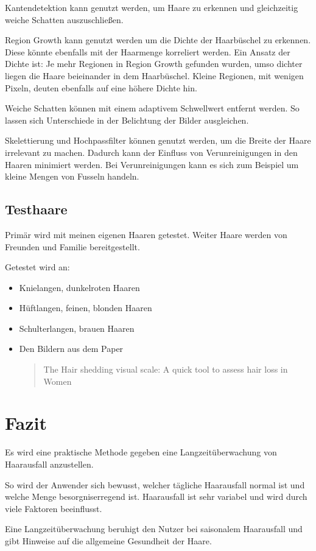 \documentclass[german,a4paper,12pt]{llncs}
\begin{document}
Kantendetektion kann genutzt werden, um Haare zu erkennen und gleichzeitig weiche Schatten auszuschließen.  

Region Growth kann genutzt werden um die Dichte der Haarbüschel zu erkennen. Diese könnte ebenfalls mit der Haarmenge korreliert werden. Ein Ansatz der Dichte ist: Je mehr Regionen in Region Growth gefunden wurden, umso dichter liegen die Haare beieinander in dem Haarbüschel. Kleine Regionen, mit wenigen Pixeln, deuten ebenfalls auf eine höhere Dichte hin. 

Weiche Schatten können mit einem adaptivem Schwellwert entfernt werden. So lassen sich Unterschiede in der Belichtung der Bilder ausgleichen. 

Skelettierung und Hochpassfilter können genutzt werden, um die Breite der Haare irrelevant zu machen. Dadurch kann der Einfluss von Verunreinigungen in den Haaren minimiert werden. Bei Verunreinigungen kann es sich zum Beispiel um kleine Mengen von Fusseln handeln.

\subsection{Testhaare}

Primär wird mit meinen eigenen Haaren getestet. Weiter Haare werden von Freunden und Familie bereitgestellt.

Getestet wird an:
\begin{itemize}
	\item Knielangen, dunkelroten Haaren
	\item Hüftlangen, feinen, blonden Haaren
	\item Schulterlangen, brauen Haaren
	\item Den Bildern aus dem Paper \blockquote{The Hair shedding visual scale: A quick tool to assess hair loss in Women} 
\end{itemize}



\section{Fazit}
Es wird eine praktische Methode gegeben eine Langzeitüberwachung von Haarausfall anzustellen. 

So wird der Anwender sich bewusst, welcher tägliche Haarausfall normal ist und welche Menge besorgniserregend ist. Haarausfall ist sehr variabel und wird durch viele Faktoren beeinflusst. 

Eine Langzeitüberwachung beruhigt den Nutzer bei saisonalem Haarausfall und gibt Hinweise auf die allgemeine Gesundheit der Haare. 
\end{document}
